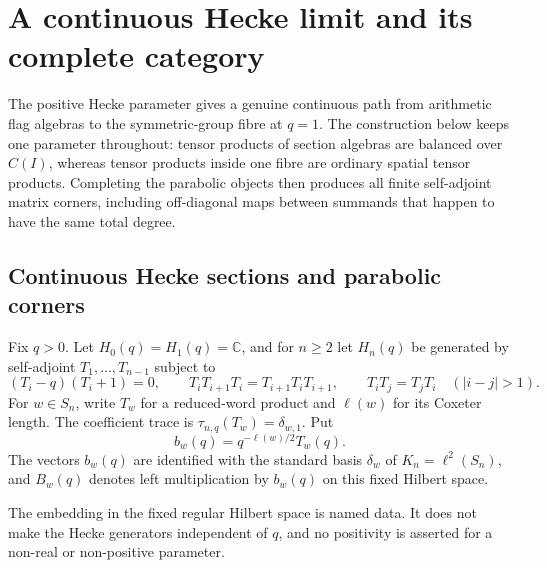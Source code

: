 \clearpage
\section{A continuous Hecke limit and its complete category}
\label{sec:f1-limit-categories}

The positive Hecke parameter gives a genuine continuous path from arithmetic
flag algebras to the symmetric-group fibre at $q=1$.  The construction below
keeps one parameter throughout: tensor products of section algebras are
balanced over $C(I)$, whereas tensor products inside one fibre are ordinary
spatial tensor products.  Completing the parabolic objects then produces all
finite self-adjoint matrix corners, including off-diagonal maps between
summands that happen to have the same total degree.

\subsection{Continuous Hecke sections and parabolic corners}

\begin{definition}
Fix $q>0$.  Let $H_0(q)=H_1(q)=\mathbb C$, and for $n\geq2$ let $H_n(q)$
be generated by self-adjoint $T_1,\ldots,T_{n-1}$ subject to
\[
 (T_i-q)(T_i+1)=0,\qquad
 T_iT_{i+1}T_i=T_{i+1}T_iT_{i+1},\qquad
 T_iT_j=T_jT_i\quad(|i-j|>1).
\]
For $w\in S_n$, write $T_w$ for a reduced-word product and
$\ell(w)$ for its Coxeter length.  The coefficient trace is
$\tau_{n,q}(T_w)=\delta_{w,1}$.  Put
\[
 b_w(q)=q^{-\ell(w)/2}T_w(q).
\]
The vectors $b_w(q)$ are identified with the standard basis $\delta_w$ of
$K_n=\ell^2(S_n)$, and $B_w(q)$ denotes left multiplication by $b_w(q)$
on this fixed Hilbert space.
\end{definition}
\begin{scope}
The embedding in the fixed regular Hilbert space is named data.  It does not
make the Hecke generators independent of $q$, and no positivity is asserted
for a non-real or non-positive parameter.
\end{scope}

